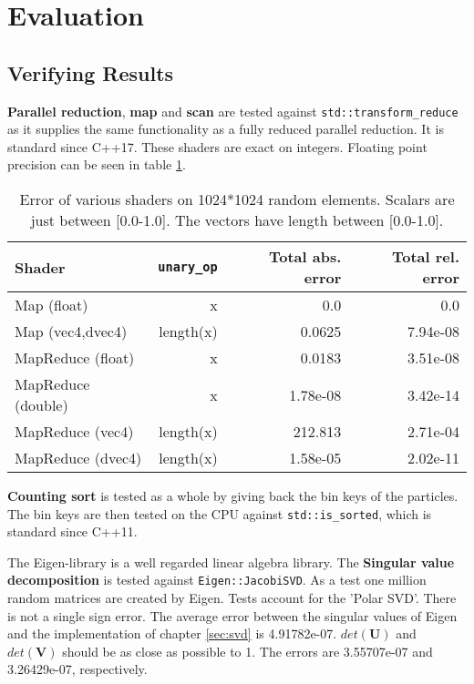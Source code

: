 \documentclass[m,times]{cgMA}
\begin{document}
\section{Evaluation}\label{sec:eval}
\subsection{Verifying Results}
\textbf{Parallel reduction}, \textbf{map} and \textbf{scan} are tested against \texttt{std::transform\_reduce} as it supplies the same functionality as a fully reduced parallel reduction. It is standard since C++17. These shaders are exact on integers. Floating point precision can be seen in table \ref{tab:parallel_red}.
\begin{table}[!b]
  \begin{tabular}{|l|r|r|r|}\hline
    Shader       & \texttt{unary\_op} & Total abs. error & Total rel. error \\\hline
    Map (float)   & x          & 0.0    & 0.0      \\\hline
    Map (vec4,dvec4)   & length(x)  &0.0625 & 7.94e-08 \\\hline\hline
    MapReduce (float)& x  &0.0183 & 3.51e-08 \\\hline
    MapReduce (double)& x  &1.78e-08 & 3.42e-14 \\\hline
    MapReduce (vec4)& length(x)  &212.813 & 2.71e-04 \\\hline
    MapReduce (dvec4)& length(x)  &1.58e-05 & 2.02e-11 \\\hline
  \end{tabular}
  \caption{Error of various shaders on 1024*1024 random elements. Scalars are just between [0.0-1.0]. The vectors have length between [0.0-1.0].}
  \label{tab:parallel_red}
\end{table}

\textbf{Counting sort} is tested as a whole by giving back the bin keys of the particles. The bin keys are then tested on the CPU against \texttt{std::is\_sorted}, which is standard since C++11.

The Eigen-library \cite{EIGEN:LIBRARY} is a well regarded linear algebra library. The \textbf{Singular value decomposition} is tested against \texttt{Eigen::JacobiSVD}. As a test one million random matrices are created by Eigen. Tests account for the 'Polar SVD'. There is not a single sign error. The average error between the singular values of Eigen and the implementation of chapter \ref{sec:svd} is 4.91782e-07. $det(\boldsymbol{U})$ and $det(\boldsymbol{V})$ should be as close as possible to 1. The errors are 3.55707e-07 and 3.26429e-07, respectively.
\end{document}
